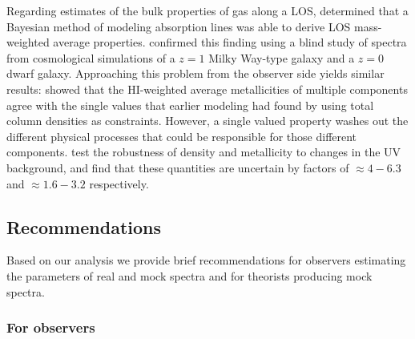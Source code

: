 \documentclass[fleqn,usenatbib]{mnras}
\begin{document}
Regarding estimates of the bulk properties of gas along a LOS,
\cite{liang2018Observing} determined that a Bayesian method of modeling absorption lines was able to derive LOS  mass-weighted average properties.
\cite{marra2021.cosmo.sims.test.observational.modeling} confirmed this finding using a blind study of spectra from cosmological simulations of a $z=1$ Milky Way-type galaxy and a $z=0$ dwarf galaxy.
Approaching this problem from the observer side yields similar results:
\cite{sameer2021Cloudbycloud} showed that the HI-weighted average metallicities of multiple components agree with the single values that earlier modeling had found by using total column densities as constraints.
However, a single valued property washes out the different physical processes that could be responsible for those different components.
\cite{acharya2021How} test the robustness of density and metallicity to changes in the UV background, and find that these quantities are uncertain by factors of $\approx 4-6.3$ and $\approx 1.6-3.2$ respectively.

\subsection{Recommendations}

Based on our analysis we provide brief recommendations for observers estimating the parameters of real and mock spectra and for theorists producing mock spectra.

\subsubsection{For observers}
\end{document}
